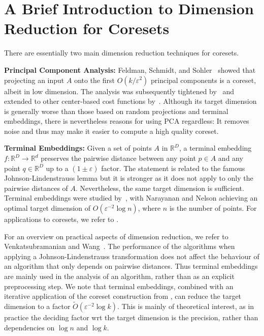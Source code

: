\section{A Brief Introduction to Dimension Reduction for Coresets}
There are essentially two main dimension reduction techniques for coresets.

{\bf Principal Component Analysis:} Feldman, Schmidt, and Sohler~\cite{FSS13} showed that projecting an input $A$ onto the first $O(k/\varepsilon^2)$ principal components is a coreset, albeit in low dimension. The analysis was subsequently tightened by~\cite{CEMMP15} and extended to other center-based cost functions by~\cite{SohlerW18}. Although its target dimension is generally worse than those based on random projections and terminal embeddings, there is nevertheless reasons for using PCA regardless: It removes noise and thus may make it easier to compute a high quality coreset.

{\bf Terminal Embeddings:} Given a set of points $A$ in $\mathbb{R}^D$, a terminal embedding $f:\mathbb{R}^D\rightarrow \mathbb{R}^d$ preserves the pairwise distance between any point $p\in A$ and any point $q\in \mathbb{R}^D$ up to a $(1\pm \varepsilon)$ factor. The statement is related to the famous Johnson-Lindenstrauss lemma but it is stronger as it does not apply to only the pairwise distances of $A$. Nevertheless, the same target dimension is sufficient. Terminal embeddings were studied by~\cite{ElkinFN17,MahabadiMMR18,NaN18}, with Narayanan and Nelson \cite{NaN18} achieving an optimal target dimension of $O(\varepsilon^{-2}\log n)$, where $n$ is the number of points. For applications to coresets, we refer to \cite{BecchettiBC0S19,Cohen-AddadSS21,huang2020coresets}.

For an overview on practical aspects of dimension reduction, we refer to Venkatsubramanian and Wang~\cite{VenkatasubramanianW11}. The performance of the algorithms when applying a Johnson-Lindenstrauss transformation does not affect the behaviour of an algorithm that only depends on pairwise distances. Thus terminal embeddings are mainly used in the analysis of an algorithm, rather than as an explicit preprocessing step.
We note that terminal embeddings, combined with an iterative application of the coreset construction from \cite{BravermanJKW21}, can reduce the target dimension to a factor $\tilde{O}(\varepsilon^{-2} \log k)$. This is mainly of theoretical interest, as in practice the deciding factor wrt the target dimension is the precision, rather than dependencies on $\log n$ and $\log k$.







